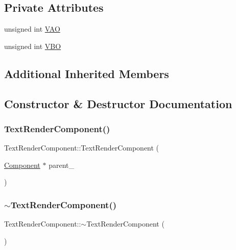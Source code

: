 \subsection*{Private Attributes}
\begin{DoxyCompactItemize}
\item 
unsigned int \hyperlink{classTextRenderComponent_a04eb58b08e5bdc1d16d80cdc5eed5d9b}{V\+AO}
\item 
unsigned int \hyperlink{classTextRenderComponent_a5f1d776333e1fb3ea2ba028fde4202f0}{V\+BO}
\end{DoxyCompactItemize}
\subsection*{Additional Inherited Members}


\subsection{Constructor \& Destructor Documentation}
\mbox{\label{classTextRenderComponent_a1c68e979570639a0f422b0c65f13cc1f}} 
\subsubsection{\texorpdfstring{Text\+Render\+Component()}{TextRenderComponent()}}
{\footnotesize\ttfamily Text\+Render\+Component\+::\+Text\+Render\+Component (\begin{DoxyParamCaption}\item[{\hyperlink{classComponent}{Component} $\ast$}]{parent\+\_\+ }\end{DoxyParamCaption})}

\mbox{\label{classTextRenderComponent_ac1558f65e70d5392ced81e8667c77ed1}} 
\subsubsection{\texorpdfstring{$\sim$\+Text\+Render\+Component()}{~TextRenderComponent()}}
{\footnotesize\ttfamily Text\+Render\+Component\+::$\sim$\+Text\+Render\+Component (\begin{DoxyParamCaption}{ }\end{DoxyParamCaption})}



